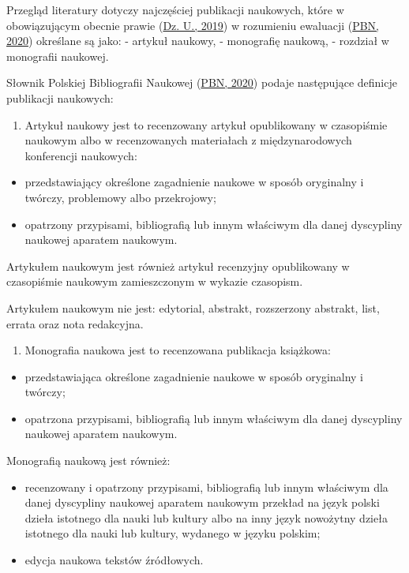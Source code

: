 \documentclass[
  12pt,
]{article}
\providecommand{\tightlist}{%
  \setlength{\itemsep}{0pt}\setlength{\parskip}{0pt}}
\begin{document}
Przegląd literatury dotyczy najczęściej publikacji naukowych, które w
obowiązującym obecnie prawie (\protect\hyperlink{ref-dz.u.2019}{Dz. U.,
2019}) w rozumieniu ewaluacji (\protect\hyperlink{ref-pbn2020}{PBN,
2020}) określane są jako: - artykuł naukowy, - monografię naukową, -
rozdział w monografii naukowej.

Słownik Polskiej Bibliografii Naukowej
(\protect\hyperlink{ref-pbn2020}{PBN, 2020}) podaje następujące
definicje publikacji naukowych:

\begin{enumerate}
\def\labelenumi{\arabic{enumi}.}
\tightlist
\item
  Artykuł naukowy jest to recenzowany artykuł opublikowany w czasopiśmie
  naukowym albo w recenzowanych materiałach z międzynarodowych
  konferencji naukowych:
\end{enumerate}

\begin{itemize}
\tightlist
\item
  przedstawiający określone zagadnienie naukowe w sposób oryginalny i
  twórczy, problemowy albo przekrojowy;
\item
  opatrzony przypisami, bibliografią lub innym właściwym dla danej
  dyscypliny naukowej aparatem naukowym.
\end{itemize}

Artykułem naukowym jest również artykuł recenzyjny opublikowany w
czasopiśmie naukowym zamieszczonym w wykazie czasopism.

Artykułem naukowym nie jest: edytorial, abstrakt, rozszerzony abstrakt,
list, errata oraz nota redakcyjna.

\begin{enumerate}
\def\labelenumi{\arabic{enumi}.}
\setcounter{enumi}{1}
\tightlist
\item
  Monografia naukowa jest to recenzowana publikacja książkowa:
\end{enumerate}

\begin{itemize}
\tightlist
\item
  przedstawiająca określone zagadnienie naukowe w sposób oryginalny i
  twórczy;
\item
  opatrzona przypisami, bibliografią lub innym właściwym dla danej
  dyscypliny naukowej aparatem naukowym.
\end{itemize}

Monografią naukową jest również:

\begin{itemize}
\tightlist
\item
  recenzowany i opatrzony przypisami, bibliografią lub innym właściwym
  dla danej dyscypliny naukowej aparatem naukowym przekład na język
  polski dzieła istotnego dla nauki lub kultury albo na inny język
  nowożytny dzieła istotnego dla nauki lub kultury, wydanego w języku
  polskim;
\item
  edycja naukowa tekstów źródłowych.
\end{itemize}
\end{document}
